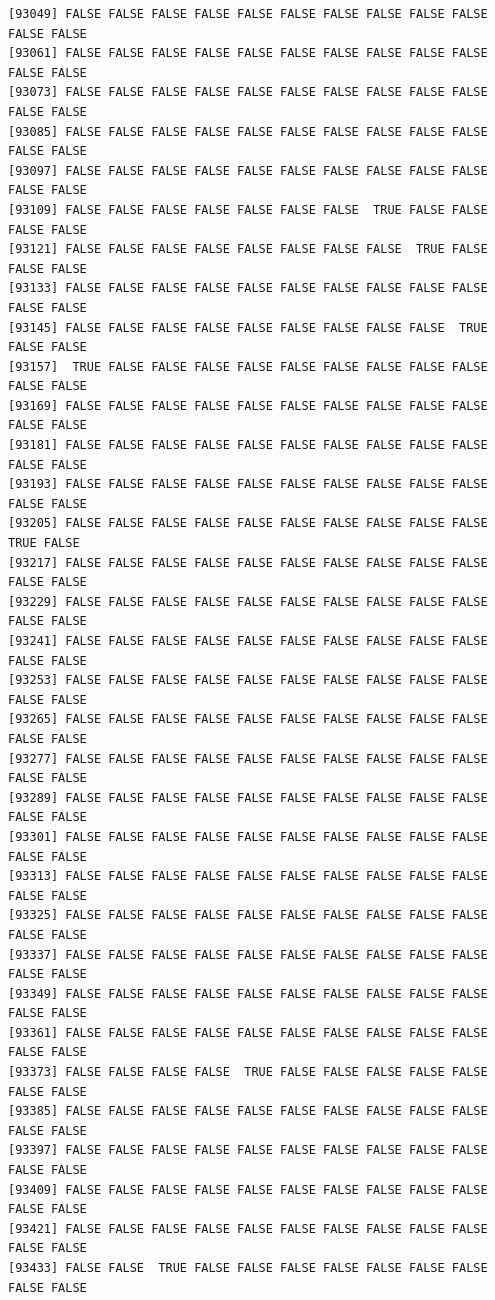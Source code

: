 \documentclass[
  a4paper,
  DIV=11,
  numbers=noendperiod]{scrartcl}
\begin{document}
\begin{verbatim}
[93049] FALSE FALSE FALSE FALSE FALSE FALSE FALSE FALSE FALSE FALSE FALSE FALSE
[93061] FALSE FALSE FALSE FALSE FALSE FALSE FALSE FALSE FALSE FALSE FALSE FALSE
[93073] FALSE FALSE FALSE FALSE FALSE FALSE FALSE FALSE FALSE FALSE FALSE FALSE
[93085] FALSE FALSE FALSE FALSE FALSE FALSE FALSE FALSE FALSE FALSE FALSE FALSE
[93097] FALSE FALSE FALSE FALSE FALSE FALSE FALSE FALSE FALSE FALSE FALSE FALSE
[93109] FALSE FALSE FALSE FALSE FALSE FALSE FALSE  TRUE FALSE FALSE FALSE FALSE
[93121] FALSE FALSE FALSE FALSE FALSE FALSE FALSE FALSE  TRUE FALSE FALSE FALSE
[93133] FALSE FALSE FALSE FALSE FALSE FALSE FALSE FALSE FALSE FALSE FALSE FALSE
[93145] FALSE FALSE FALSE FALSE FALSE FALSE FALSE FALSE FALSE  TRUE FALSE FALSE
[93157]  TRUE FALSE FALSE FALSE FALSE FALSE FALSE FALSE FALSE FALSE FALSE FALSE
[93169] FALSE FALSE FALSE FALSE FALSE FALSE FALSE FALSE FALSE FALSE FALSE FALSE
[93181] FALSE FALSE FALSE FALSE FALSE FALSE FALSE FALSE FALSE FALSE FALSE FALSE
[93193] FALSE FALSE FALSE FALSE FALSE FALSE FALSE FALSE FALSE FALSE FALSE FALSE
[93205] FALSE FALSE FALSE FALSE FALSE FALSE FALSE FALSE FALSE FALSE  TRUE FALSE
[93217] FALSE FALSE FALSE FALSE FALSE FALSE FALSE FALSE FALSE FALSE FALSE FALSE
[93229] FALSE FALSE FALSE FALSE FALSE FALSE FALSE FALSE FALSE FALSE FALSE FALSE
[93241] FALSE FALSE FALSE FALSE FALSE FALSE FALSE FALSE FALSE FALSE FALSE FALSE
[93253] FALSE FALSE FALSE FALSE FALSE FALSE FALSE FALSE FALSE FALSE FALSE FALSE
[93265] FALSE FALSE FALSE FALSE FALSE FALSE FALSE FALSE FALSE FALSE FALSE FALSE
[93277] FALSE FALSE FALSE FALSE FALSE FALSE FALSE FALSE FALSE FALSE FALSE FALSE
[93289] FALSE FALSE FALSE FALSE FALSE FALSE FALSE FALSE FALSE FALSE FALSE FALSE
[93301] FALSE FALSE FALSE FALSE FALSE FALSE FALSE FALSE FALSE FALSE FALSE FALSE
[93313] FALSE FALSE FALSE FALSE FALSE FALSE FALSE FALSE FALSE FALSE FALSE FALSE
[93325] FALSE FALSE FALSE FALSE FALSE FALSE FALSE FALSE FALSE FALSE FALSE FALSE
[93337] FALSE FALSE FALSE FALSE FALSE FALSE FALSE FALSE FALSE FALSE FALSE FALSE
[93349] FALSE FALSE FALSE FALSE FALSE FALSE FALSE FALSE FALSE FALSE FALSE FALSE
[93361] FALSE FALSE FALSE FALSE FALSE FALSE FALSE FALSE FALSE FALSE FALSE FALSE
[93373] FALSE FALSE FALSE FALSE  TRUE FALSE FALSE FALSE FALSE FALSE FALSE FALSE
[93385] FALSE FALSE FALSE FALSE FALSE FALSE FALSE FALSE FALSE FALSE FALSE FALSE
[93397] FALSE FALSE FALSE FALSE FALSE FALSE FALSE FALSE FALSE FALSE FALSE FALSE
[93409] FALSE FALSE FALSE FALSE FALSE FALSE FALSE FALSE FALSE FALSE FALSE FALSE
[93421] FALSE FALSE FALSE FALSE FALSE FALSE FALSE FALSE FALSE FALSE FALSE FALSE
[93433] FALSE FALSE  TRUE FALSE FALSE FALSE FALSE FALSE FALSE FALSE FALSE FALSE

\end{verbatim}
\end{document}
